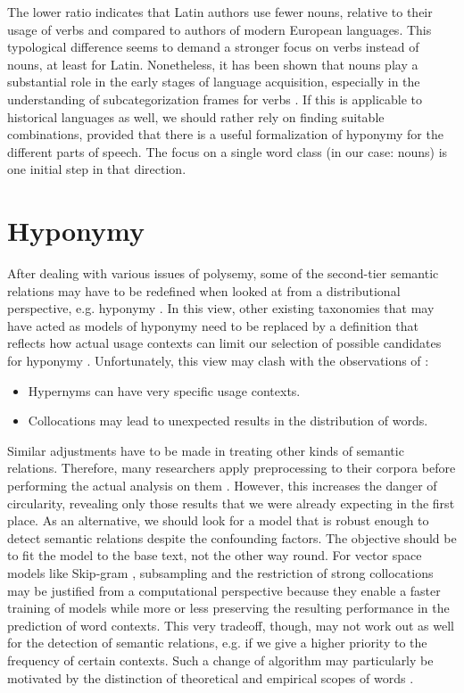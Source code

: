 \documentclass[runningheads]{llncs}
\begin{document}
The lower ratio indicates that Latin authors use fewer nouns, relative to their usage of verbs and compared to authors of modern European languages. This typological difference seems to demand a stronger focus on verbs instead of nouns, at least for Latin. Nonetheless, it has been shown that nouns play a substantial role in the early stages of language acquisition, especially in the understanding of subcategorization frames for verbs \parencite[1383]{yuanCountingNounsSimple2012}. If this is applicable to historical languages as well, we should rather rely on finding suitable combinations, provided that there is a useful formalization of hyponymy for the different parts of speech. The focus on a single word class (in our case: nouns) is one initial step in that direction.

\section{Hyponymy}
After dealing with various issues of polysemy, some of the second-tier semantic relations may have to be redefined when looked at from a distributional perspective, e.g. hyponymy \parencite[443]{herbelotMeasuringSemanticContent2013}. In this view, other existing taxonomies that may have acted as models of hyponymy need to be replaced by a definition that reflects how actual usage contexts can limit our selection of possible candidates for hyponymy \parencite[443]{rollerInclusiveSelectiveSupervised2014}. Unfortunately, this view may clash with the observations of \textcite{herbelotMeasuringSemanticContent2013}:
\begin{itemize}
      \item Hypernyms can have very specific usage contexts.
      \item Collocations may lead to unexpected results in the distribution of words.
\end{itemize}
Similar adjustments have to be made in treating other kinds of semantic relations. Therefore, many researchers apply preprocessing to their corpora before performing the actual analysis on them \parencite[56f.]{gyllenstenRgramsUnsupervisedLearning2019}. However, this increases the danger of circularity, revealing only those results that we were already expecting in the first place. As an alternative, we should look for a model that is robust enough to detect semantic relations despite the confounding factors. The objective should be to fit the model to the base text, not the other way round. For vector space models like Skip-gram \parencite[5]{mikolovEfficientEstimationWord2013}, subsampling and the restriction of strong collocations may be justified from a computational perspective because they enable a faster training of models while more or less preserving the resulting performance in the prediction of word contexts. This very tradeoff, though, may not work out as well for the detection of semantic relations, e.g. if we give a higher priority to the frequency of certain contexts. Such a change of algorithm may particularly be motivated by the distinction of theoretical and empirical scopes of words \parencite[46]{coenenAnalogieUndMetapher2013}. 
\end{document}
